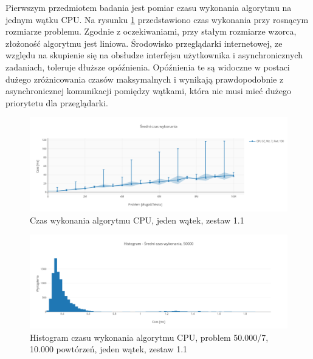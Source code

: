 Pierwszym przedmiotem badania jest pomiar czasu wykonania algorytmu na jednym wątku CPU. Na rysunku \ref{fig:chart_cpu_sc_mean_chrome} przedstawiono czas wykonania przy rosnącym rozmiarze problemu. Zgodnie z oczekiwaniami, przy stałym rozmiarze wzorca, złożoność algorytmu jest liniowa.
Środowisko przeglądarki internetowej, ze względu na skupienie się na obsłudze interfejsu użytkownika i asynchronicznych zadaniach, toleruje dłuższe opóźnienia. Opóźnienia te są widoczne w postaci dużego zróżnicowania czasów maksymalnych i wynikają prawdopodobnie z asynchronicznej komunikacji pomiędzy wątkami, która nie musi mieć dużego priorytetu dla przeglądarki.


\begin{figure}
    \centering
    \includegraphics[keepaspectratio, width=1.0\linewidth, trim=1.1cm 0.9cm 0.5cm 3.5cm, clip]{benchmarks/nvidia970_chrome/cpu_sc_mean.png}
    \caption{Czas wykonania algorytmu CPU, jeden wątek, zestaw 1.1}
    \label{fig:chart_cpu_sc_mean_chrome}
\end{figure}


\begin{figure}
    \centering
    \includegraphics[keepaspectratio, width=1.0\linewidth, trim=1.1cm 0.9cm 0.5cm 3.5cm, clip]{benchmarks/nvidia970_chrome/his.png}
    \caption{Histogram czasu wykonania algorytmu CPU, problem 50.000/7, 10.000 powtórzeń, jeden wątek, zestaw 1.1}
    \label{fig:chart_cpu_sc_his_chrome}
\end{figure}


